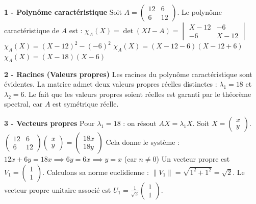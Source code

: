 \documentclass[11pt,a4paper]{article}
\begin{document}
\textbf{1 - Polynôme caractéristique}
Soit $A = \begin{pmatrix} 12 & 6 \\ 6 & 12 \end{pmatrix}$.
Le polynôme caractéristique de $A$ est :
$\chi_A(X) = \det(X I - A) = \begin{vmatrix} X - 12 & -6 \\ -6 & X - 12 \end{vmatrix}$
$\chi_A(X) = (X - 12)^2 - (-6)^2$
$\chi_A(X) = (X - 12 - 6)(X - 12 + 6)$
$\chi_A(X) = (X - 18)(X - 6)$

\textbf{2 - Racines (Valeurs propres)}
Les racines du polynôme caractéristique sont évidentes. La matrice admet deux valeurs propres réelles distinctes :
$\lambda_1 = 18$ et $\lambda_2 = 6$.
Le fait que les valeurs propres soient réelles est garanti par le théorème spectral, car $A$ est symétrique réelle.

\textbf{3 - Vecteurs propres}
Pour $\lambda_1 = 18$ : on résout $AX = \lambda_1 X$.
Soit $X = \begin{pmatrix} x \\ y \end{pmatrix}$.
$\begin{pmatrix} 12 & 6 \\ 6 & 12 \end{pmatrix} \begin{pmatrix} x \\ y \end{pmatrix} = \begin{pmatrix} 18x \\ 18y \end{pmatrix}$
Cela donne le système :
$12x + 6y = 18x \implies 6y = 6x \implies y = x$ (car $n \neq 0$)
Un vecteur propre est $V_1 = \begin{pmatrix} 1 \\ 1 \end{pmatrix}$.
Calculons sa norme euclidienne : $\|V_1\| = \sqrt{1^2 + 1^2} = \sqrt{2}$.
Le vecteur propre unitaire associé est $U_1 = \frac{1}{\sqrt{2}} \begin{pmatrix} 1 \\ 1 \end{pmatrix}$.
\end{document}
